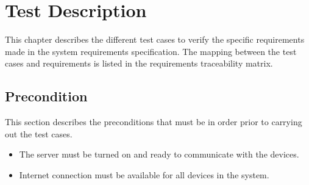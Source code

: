 \chapter{Test Description}
This chapter describes the different test cases to verify the specific requirements made in the system requirements specification. The mapping between the test cases and requirements is listed in the requirements traceability matrix.
\section{Precondition}
This section describes the preconditions that must be in order prior to carrying out the test cases.

\begin{itemize}
\item The server must be turned on and ready to communicate with the devices.
\item Internet connection must be available for all devices in the system.
\end{itemize}












